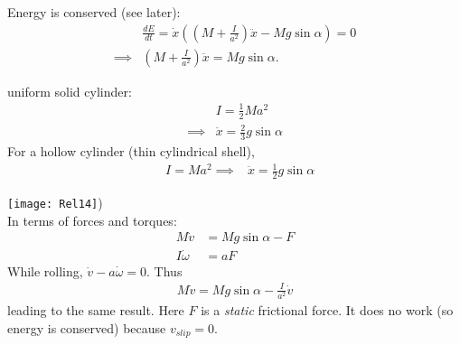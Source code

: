 \documentclass[a4paper]{article}
\begin{document}
Energy is conserved (see later):
\begin{equation*}
\begin{aligned}
&\frac{dE}{dt}=\dot{x}\left(\left(M+\frac{I}{a^2}\right)\ddot{x}-Mg\sin\alpha\right)=0\\
\implies &\left(M+\frac{I}{a^2}\right)\ddot{x}=Mg\sin\alpha.
\end{aligned}
\end{equation*}

\begin{eg} uniform solid cylinder:\\
\begin{equation*}
\begin{aligned}
&I=\frac{1}{2}Ma^2\\
\implies & \ddot{x}=\frac{2}{3}g\sin\alpha
\end{aligned}
\end{equation*}
For a hollow cylinder (thin cylindrical shell),
\begin{equation*}
\begin{aligned}
&I=Ma^2
\implies &\ddot{x}=\frac{1}{2}g\sin\alpha
\end{aligned}
\end{equation*}
\end{eg}
\texttt{[image: Rel14]})\\

In terms of forces and torques:
\begin{equation*}
\begin{aligned}
M\dot{v}&=Mg\sin\alpha-F\\
I\dot{\omega}&=aF
\end{aligned}
\end{equation*}
While rolling, $\dot{v}-a\dot{\omega}=0$. Thus
\begin{equation*}
\begin{aligned}
M\dot{v}=Mg\sin\alpha-\frac{I}{a^2}\dot{v}
\end{aligned}
\end{equation*}
leading to the same result. Here $F$ is a \emph{static} frictional force. It does no work (so energy is conserved) because $v_{slip}=0$.
\end{document}
